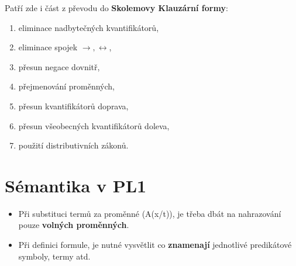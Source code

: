 \noindent Patří zde i část z převodu do \textbf{Skolemovy Klauzární formy}:
\begin{enumerate}
    \item eliminace nadbytečných kvantifikátorů,
    \item eliminace spojek $\rightarrow, \leftrightarrow$,
    \item přesun negace dovnitř,
    \item přejmenování proměnných,
    \item přesun kvantifikátorů doprava,
    \item přesun všeobecných kvantifikátorů doleva,
    \item použití distributivních zákonů.
\end{enumerate}

\section{Sémantika v PL1}
\begin{itemize}
    \item Při substituci termů za proměnné (A(x/t)), je třeba dbát na nahrazování pouze \textbf{volných proměnných}.
    \item Při definici formule, je nutné vysvětlit co \textbf{znamenají} jednotlivé predikátové symboly, termy atd.
\end{itemize}

